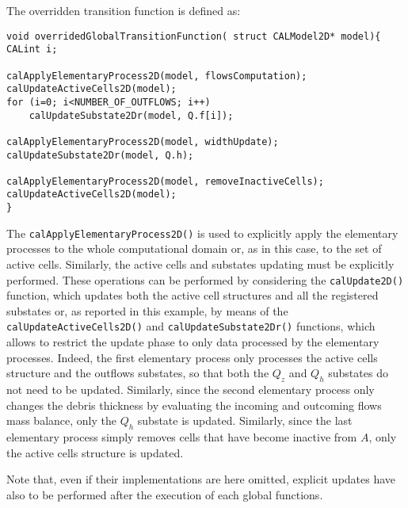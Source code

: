 \noindent The overridden transition function is defined as:
\begin{lstlisting}
void overridedGlobalTransitionFunction( struct CALModel2D* model){
CALint i;

calApplyElementaryProcess2D(model, flowsComputation);
calUpdateActiveCells2D(model);
for (i=0; i<NUMBER_OF_OUTFLOWS; i++)
	calUpdateSubstate2Dr(model, Q.f[i]);

calApplyElementaryProcess2D(model, widthUpdate);
calUpdateSubstate2Dr(model, Q.h);

calApplyElementaryProcess2D(model, removeInactiveCells);
calUpdateActiveCells2D(model);
}
\end{lstlisting}

\noindent The \verb'calApplyElementaryProcess2D()' is used to
explicitly apply the elementary processes to the whole
computational domain or, as in this case, to the set of active
cells. Similarly, the active cells and substates updating must be
explicitly performed. These operations can be performed by
considering the \verb'calUpdate2D()' function, which updates both
the active cell structures and all the registered substates or, as
reported in this example, by means of the
\verb'calUpdateActiveCells2D()' and \verb'calUpdateSubstate2Dr()'
functions, which allows to restrict the update phase to only data
processed by the elementary processes. Indeed, the first
elementary process only processes the active cells structure and
the outflows substates, so that both the $Q_z$ and $Q_h$ substates
do not need to be updated. Similarly, since the second elementary
process only changes the debris thickness by evaluating the
incoming and outcoming flows mass balance, only the $Q_h$ substate
is updated. Similarly, since the last elementary process simply
removes cells that have become inactive from $A$, only the active
cells structure is updated.

Note that, even if their implementations are here omitted,
explicit updates have also to be performed after the execution of
each global functions.







